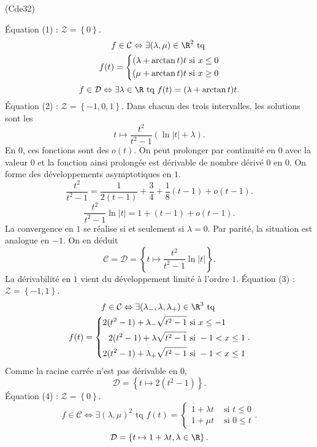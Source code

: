 \begin{tiny}(Cde32)\end{tiny}
\'Equation (1) : $\mathcal{Z} = \left\lbrace 0 \right\rbrace$.
\begin{multline*}
  f \in \mathcal{C} \Leftrightarrow \exists (\lambda, \mu) \in \R^2 \text{ tq } \\
  f(t) =
  \left\lbrace
  \begin{aligned}
    (\lambda + \arctan t)t &\text{ si } x \leq 0 \\
    (\mu + \arctan t)t &\text{ si } x \geq 0
  \end{aligned}
  \right. 
\end{multline*}
\[
  f \in \mathcal{D} \Leftrightarrow \exists \lambda \in \R \text{ tq }
  f(t) = (\lambda + \arctan t)t.  
\]
\'Equation (2) : $\mathcal{Z} = \left\lbrace -1, 0, 1 \right\rbrace$.
Dans chacun des trois intervalles, les solutions sont les
\[
  t \mapsto \frac{t^2}{t^2 - 1}\left(\ln|t| + \lambda\right).
\]
En $0$, ces fonctions sont des $o(t)$. On peut prolonger par continuité en $0$ avec la valeur $0$ et la fonction ainsi prolongée est dérivable de nombre dérivé $0$ en $0$.\newline
On forme des développements asymptotiques en $1$.
\[
  \frac{t^2}{t^2 - 1} = \frac{1}{2(t-1)} + \frac{3}{4} + \frac{1}{8}(t-1) + o(t-1).
\]
\[
  \frac{t^2}{t^2 - 1}\ln|t| = 1 + (t-1) + o(t-1).
\]
La convergence en $1$ se réalise si et seulement si $\lambda=0$. Par parité, la situation est analogue en $-1$. On en déduit
\[
  \mathcal{C} = \mathcal{D} = \left\lbrace t \mapsto \frac{t^2}{t^2 - 1} \ln|t|\right\rbrace.
\]
La dérivabilité en $1$ vient du développement limité à l'ordre $1$.\newline
\'Equation (3) : $\mathcal{Z} = \left\lbrace -1, 1 \right\rbrace$.
\begin{multline*}
  f \in \mathcal{C} \Leftrightarrow \exists (\lambda_-, \lambda, \lambda_+) \in \R^3 \text{ tq } \\
  f(t) =
  \left\lbrace
  \begin{aligned}
    2(t^2-1)+ \lambda_-\sqrt{t^2 - 1} &\text{ si } x \leq -1 \\
    2(t^2-1)+ \lambda \sqrt{t^2 - 1} &\text{ si } -1 < x \leq 1 \\
    2(t^2-1)+ \lambda_+\sqrt{t^2 - 1} &\text{ si } -1 < x \leq 1 
  \end{aligned}
  \right. .
\end{multline*}
Comme la racine carrée n'est pas dérivable en $0$,
\[
  \mathcal{D} 
  = \left\lbrace t \mapsto 2(t^2-1)\right\rbrace.
\]
\'Equation (4) : $\mathcal{Z} = \left\lbrace 0 \right\rbrace$.
\[
  f \in \mathcal{C} \Leftrightarrow \exists (\lambda,\mu)^2 \text{ tq }
  f(t) =
  \left\lbrace
  \begin{aligned}
    1 + \lambda t &\text{ si } t \leq 0 \\
    1 + \mu t &\text{ si } 0 \leq t 
  \end{aligned}
\right. .
\]
\[
  \mathcal{D} = \left\lbrace t \mapsto 1 + \lambda t , \lambda \in \R\right\rbrace .
\]
